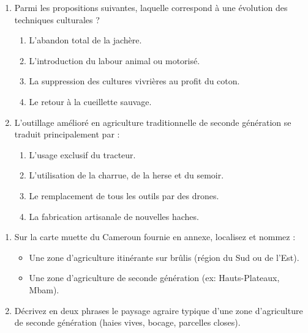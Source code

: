 \documentclass[11pt]{article}
\begin{document}
\begin{exercice}
\begin{enumerate}
    \item Parmi les propositions suivantes, laquelle correspond à une \og évolution des techniques culturales \fg{} ?
    \begin{enumerate}
        \item L'abandon total de la jachère.
        \item L'introduction du labour animal ou motorisé.
        \item La suppression des cultures vivrières au profit du coton.
        \item Le retour à la cueillette sauvage.
    \end{enumerate}
    \item L'outillage amélioré en agriculture traditionnelle de seconde génération se traduit principalement par :
    \begin{enumerate}
        \item L'usage exclusif du tracteur.
        \item L'utilisation de la charrue, de la herse et du semoir.
        \item Le remplacement de tous les outils par des drones.
        \item La fabrication artisanale de nouvelles haches.
    \end{enumerate}
\end{enumerate}
\end{exercice}

\begin{exercice}
\begin{enumerate}
    \item Sur la carte muette du Cameroun fournie en annexe, localisez et nommez :
    \begin{itemize}
        \item Une zone d'agriculture itinérante sur brûlis (région du Sud ou de l'Est).
        \item Une zone d'agriculture de seconde génération (ex: Hauts-Plateaux, Mbam).
    \end{itemize}
    \item Décrivez en deux phrases le paysage agraire typique d'une zone d'agriculture de seconde génération (haies vives, bocage, parcelles closes).
\end{enumerate}
\end{exercice}
\end{document}
